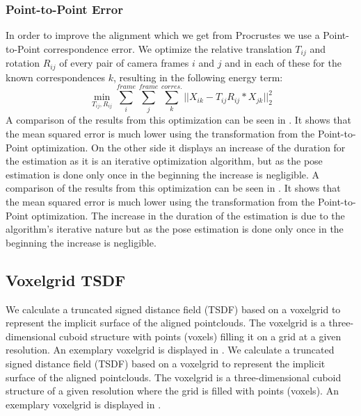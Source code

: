 \documentclass[10pt,twocolumn,letterpaper]{article}
\begin{document}
\subsubsection{Point-to-Point Error}
In order to improve the alignment which we get from Procrustes we use a Point-to-Point correspondence error. We optimize the relative translation $T_{ij}$ and rotation $R_{ij}$ of every pair of camera frames $i$ and $j$ and in each of these for the known correspondences $k$, resulting in the following energy term:
\begin{equation}\label{eq5}
\min_{T_{ij}, R_{ij}} \sum_{i}^{frame}\sum_{j}^{frame}\sum_{k}^{corres.} || X_{ik} - T_{ij}R_{ij}*X_{jk} ||_2^2
\end{equation}
A comparison of the results from this optimization can be seen in . It shows that the mean squared error is much lower using the transformation from the Point-to-Point optimization. On the other side it displays an increase of the duration for the estimation as it is an iterative optimization algorithm, but as the pose estimation is done only once in the beginning the increase is negligible.
A comparison of the results from this optimization can be seen in . It shows that the mean squared error is much lower using the transformation from the Point-to-Point optimization. The increase in the duration of the estimation is due to the algorithm's iterative nature but as the pose estimation is done only once in the beginning the increase is negligible.
%
\subsection{Voxelgrid TSDF}
We calculate a truncated signed distance field (TSDF) based on a voxelgrid to represent the implicit surface of the aligned pointclouds. The voxelgrid is a three-dimensional cuboid structure with points (voxels) filling it on a grid at a given resolution. An exemplary voxelgrid is displayed in . 
We calculate a truncated signed distance field (TSDF) based on a voxelgrid to represent the implicit surface of the aligned pointclouds. The voxelgrid is a three-dimensional cuboid structure of a given resolution where the grid is filled with points (voxels). An exemplary voxelgrid is displayed in . 
\end{document}
